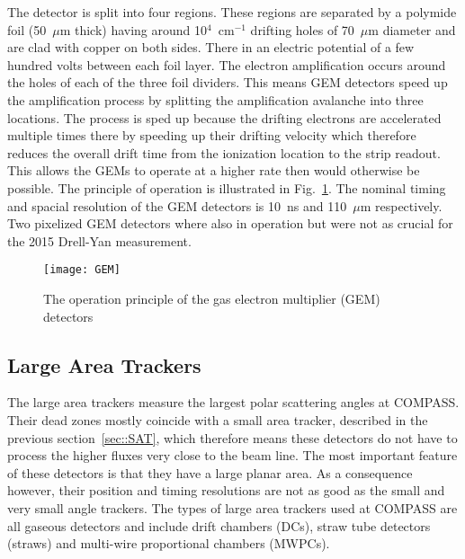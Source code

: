 The detector is split into four regions.  These regions are separated by a
polymide foil (50~$\mu$m thick) having around 10$^4$~cm$^{-1}$ drifting holes of
70~$\mu$m diameter and are clad with copper on both sides.  There in an electric
potential of a few hundred volts between each foil layer.  The electron
amplification occurs around the holes of each of the three foil dividers.  This
means GEM detectors speed up the amplification process by splitting the
amplification avalanche into three locations.  The process is sped up because
the drifting electrons are accelerated multiple times there by speeding up their
drifting velocity which therefore reduces the overall drift time from the
ionization location to the strip readout.  This allows the GEMs to operate at a
higher rate then would otherwise be possible.  The principle of operation is
illustrated in Fig.~\ref{fig::GEM}.  The nominal timing and spacial resolution
of the GEM detectors is 10~ns and 110~$\mu$m respectively.  Two pixelized GEM
detectors where also in operation but were not as crucial for the 2015 Drell-Yan
measurement.

\begin{figure}[h!t]
  \centering
  \texttt{[image: GEM]}
  \caption{The operation principle of the gas electron multiplier (GEM)
    detectors}
  \label{fig::GEM}
\end{figure}

\subsection{Large Area Trackers}
The large area trackers measure the largest polar scattering angles at COMPASS.
Their dead zones mostly coincide with a small area tracker, described in the
previous section~\ref{sec::SAT}, which therefore means these detectors do not
have to process the higher fluxes very close to the beam line.  The most
important feature of these detectors is that they have a large planar area. As a
consequence however, their position and timing resolutions are not as good as
the small and very small angle trackers.  The types of large area trackers used
at COMPASS are all gaseous detectors and include drift chambers (DCs), straw
tube detectors (straws) and multi-wire proportional chambers (MWPCs). \par

